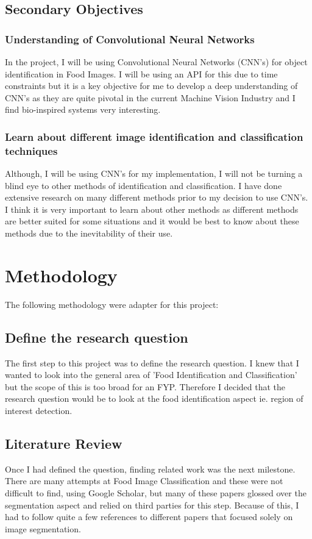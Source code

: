 \subsection*{Secondary Objectives}
\subsubsection*{Understanding of Convolutional Neural Networks}
In the project, I will be using Convolutional Neural Networks (CNN's) for object identification in Food Images.
I will be using an API for this due to time constraints but it is a key
objective for me to develop a deep understanding of CNN's as they are quite pivotal in the current Machine Vision Industry and I find bio-inspired systems very interesting.

\subsubsection*{Learn about different image identification and classification techniques}
Although, I will be using CNN's for my implementation, I will not be turning a
blind eye to other methods of identification and classification.
I have done extensive research on many different methods prior to my decision to use CNN's.
I think it is very important to learn about other methods as different methods
are better suited for some situations and it would be best to know about these methods due to the inevitability of their use.

\section{Methodology}
The following methodology were adapter for this project:

\subsection*{Define the research question}
The first step to this project was to define the research question.
I knew that I wanted to look into the general area of 'Food Identification and
Classification' but the scope of this is too broad for an FYP.
Therefore I decided that the research question would be to look at the food identification aspect ie. region of interest detection.

\subsection*{Literature Review}
Once I had defined the question, finding related work was the next milestone.
There are many attempts at Food Image Classification and these were not difficult to find, using Google Scholar, but many of these papers glossed over the segmentation aspect and relied on third parties for this step.
Because of this, I had to follow quite a few references to different papers that focused solely on image segmentation.

